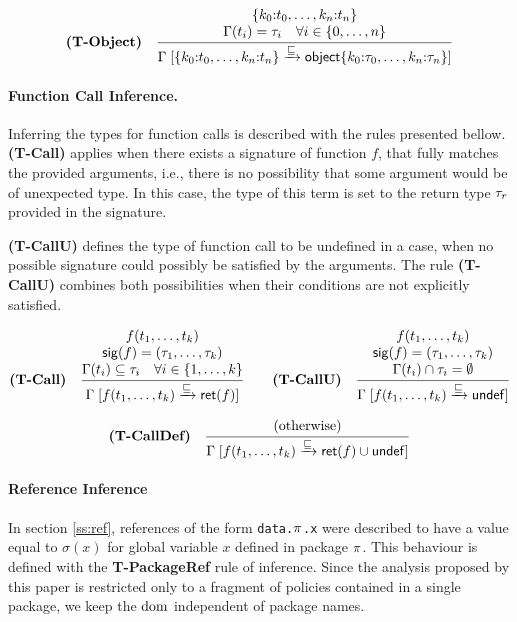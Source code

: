 \[
\textbf{(T-Object)}\quad
\inferrule{
  \{k_0{:}t_0, \ldots, k_n{:}t_n\} \\
  \typof(t_i) = \ty_i \quad \forall \ranges{i}{0}{n}}
{
  \refine{\{k_0{:}t_0, \ldots, k_n{:}t_n\}}{\Obj{k_0{:}\ty_0, \ldots, k_n{:}\ty_n}}
}
\]

\paragraph{Function Call Inference.}
Inferring the types for function calls is described with the rules presented bellow.
\textbf{(T-Call)} applies when there exists a signature of function $f$, that fully matches the provided arguments, i.e., there is no possibility that some argument would be of unexpected type.
In this case, the type of this term is set to the return type $\tau_r$ provided in the signature.

\textbf{(T-CallU)} defines the type of function call to be undefined in a case, when no possible signature could possibly be satisfied by the arguments.
The rule \textbf{(T-CallU)} combines both possibilities when their conditions are not explicitly satisfied.

\[
\textbf{(T-Call)}\quad
\inferrule{
  f(t_1, \ldots, t_k) \\
  \mathsf{sig}(f) = (\ty_1, \ldots, \ty_k) \\
  \typof(t_i) \subseteq \ty_i \quad \forall \ranges{i}{1}{k}
}{
  \refine{f(t_1,\ldots,t_k)}{\ret(f)}
}
\qquad
\textbf{(T-CallU)}\quad
\inferrule{
  f(t_1, \ldots, t_k) \\
  \sig(f) = (\ty_1, \ldots, \ty_k) \\
  \typof(t_i) \cap \ty_i = \emptyset
}{
  \refine{f(t_1,\ldots,t_k)}{\Undef}
}
\]

\[
\textbf{(T-CallDef)}\quad
\inferrule{
  \text{(otherwise)}
}{
  \refine{f(t_1,\ldots,t_k)}{\ret(f) \cup \Undef}
}
\]

\paragraph{Reference Inference}

In section \ref{ss:ref}, references of the form \texttt{data.$\pi$.x} were described to have a value equal to $\sigma(x)$ for global variable $x$ defined in package $\pi$.
This behaviour is defined with the \textbf{T-PackageRef} rule of inference.
Since the analysis proposed by this paper is restricted only to a fragment of policies contained in a single package, we keep the $\mathrm{dom}$ independent of package names.

